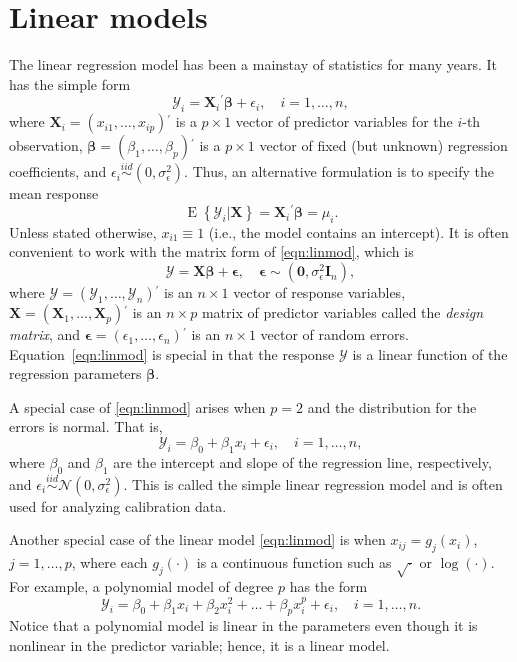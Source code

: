 \documentclass[cmfont,usenames,dvipsnames,leqno]{afit-etd}\usepackage[]{graphicx}\usepackage[]{color}
\newcommand{\trans}{\ensuremath{^\prime}}
\newcommand{\bc}[1]{\ensuremath{\bm{\mathcal{#1}}}}
\newcommand{\mc}[1]{\ensuremath{\mathcal{#1}}}
\newcommand{\E}{\operatorname{E}}
\newcommand{\X}{\ensuremath{\bm{X}}}
\begin{document}
\section{Linear models}
\label{sec:lm}
The linear regression model has been a mainstay of statistics for many years. It has the simple form
\begin{equation}
\label{eqn:linmod}
  \mc{Y}_i = \X_i\trans\bm{\beta} + \epsilon_i, \quad i = 1, \dotsc, n,
\end{equation}
where $\X_i = (x_{i1}, \dotsc, x_{ip})\trans$ is a $p \times 1$ vector of predictor variables for the $i$-th observation, $\bm{\beta} = (\beta_1, \dotsc, \beta_p)\trans$ is a $p \times 1$ vector of fixed (but unknown) regression coefficients, and $\epsilon_i \stackrel{iid}{\sim} (0, \sigma_\epsilon^2)$. Thus, an alternative formulation is to specify the mean response
\begin{equation*}
  \E\left\{\mc{Y}_i|\X\right\} = \X_i\trans\bm{\beta} = \mu_i.
\end{equation*}
Unless stated otherwise, $x_{i1} \equiv 1$ (i.e., the model contains an intercept). It is often convenient to work with the matrix form of \eqref{eqn:linmod}, which is
\begin{equation}
\label{eqn:linmod-matrixform}
  \bc{Y} = \X\bm{\beta} + \bm{\epsilon}, \quad \bm{\epsilon} \sim (\bm{0}, \sigma_\epsilon^2\bm{I}_n), 
\end{equation}
where $\bc{Y} = (\mc{Y}_1, \dotsc, \mc{Y}_n)\trans$ is an $n \times 1$ vector of response variables, $\X = (\X_1, \dotsc, \X_p)\trans$ is an $n \times p$ matrix of predictor variables called the \textit{design matrix}, and $\bm{\epsilon} = (\epsilon_1, \dotsc, \epsilon_n)\trans$ is an $n \times 1$ vector of random errors. Equation~\eqref{eqn:linmod} is special in that the response $\bc{Y}$ is a linear function of the regression parameters $\bm{\beta}$. 

A special case of \eqref{eqn:linmod} arises when $p = 2$ and the distribution for the errors is normal. That is,
\begin{equation}
\label{eqn:linmod-simple}
  \mc{Y}_i = \beta_0 + \beta_1 x_i + \epsilon_i, \quad i = 1, \dotsc, n,
\end{equation}
where $\beta_0$ and $\beta_1$ are the intercept and slope of the regression line, respectively, and $\epsilon_i \stackrel{iid}{\sim} \mc{N}(0, \sigma_\epsilon^2)$. This is called the simple linear regression model and is often used for analyzing calibration data.

Another special case of the linear model \eqref{eqn:linmod} is when $x_{ij} = g_j(x_i)$, $j = 1, \dotsc, p$, where each $g_j(\cdot)$ is a continuous function such as $\sqrt{\cdot}$ or $\log(\cdot)$. For example, a polynomial model of degree $p$ has the form
\begin{equation*}
  \mc{Y}_i = \beta_0 + \beta_1 x_i + \beta_2 x_i^2 + \dotsc + \beta_p x_i^p + \epsilon_i, \quad i = 1, \dotsc, n.
\end{equation*}
Notice that a polynomial model is linear in the parameters even though it is nonlinear in the predictor variable; hence, it is a linear model.
\end{document}
